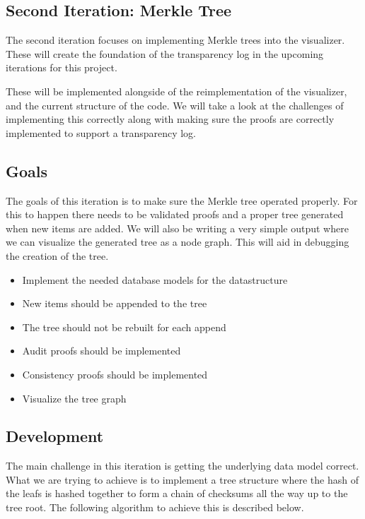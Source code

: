 \documentclass[../Main/thesis.tex]{subfiles}
\begin{document}
\subsection{Second Iteration: Merkle Tree}%
\label{sub:merkle_tree}
The second iteration focuses on implementing Merkle trees into the visualizer.
These will create the foundation of the transparency log in the upcoming
iterations for this project.

These will be implemented alongside of the reimplementation of the visualizer,
and the current structure of the code. We will take a look at the challenges of
implementing this correctly along with making sure the proofs are correctly
implemented to support a transparency log.

\subsection*{Goals}%
\label{sub:second_iteration_goals}
The goals of this iteration is to make sure the Merkle tree operated properly.
For this to happen there needs to be validated proofs and a proper tree
generated when new items are added. We will also be writing a very simple output
where we can visualize the generated tree as a node graph. This will aid in
debugging the creation of the tree.

\begin{itemize}
    \item Implement the needed database models for the datastructure
    \item New items should be appended to the tree
    \item The tree should not be rebuilt for each append
    \item Audit proofs should be implemented
    \item Consistency proofs should be implemented
    \item Visualize the tree graph
\end{itemize}


\subsection*{Development}%
\label{sub:second_iteration_development}
The main challenge in this iteration is getting the underlying data model
correct. What we are trying to achieve is to implement a tree structure where
the hash of the leafs is hashed together to form a chain of checksums all the
way up to the tree root. The following algorithm to achieve this is described
below.
\end{document}
